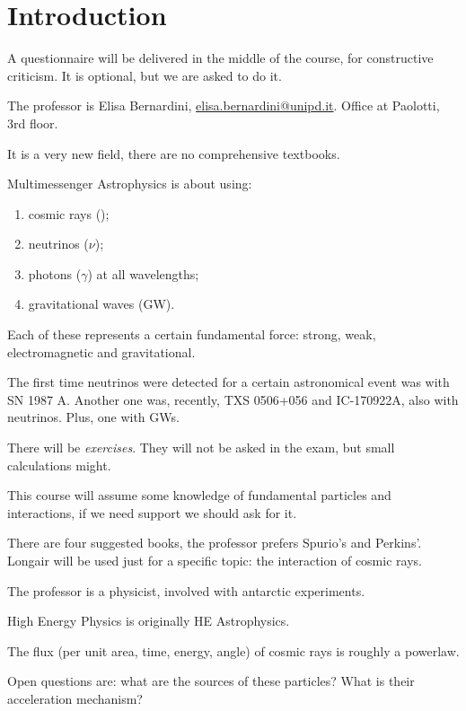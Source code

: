 \documentclass[main.tex]{subfiles}
\begin{document}

\section*{Introduction}


A questionnaire will be delivered in the middle of the course, for constructive criticism. It is optional, but we are asked to do it. 

The professor is Elisa Bernardini, \url{elisa.bernardini@unipd.it}. Office at Paolotti, 3rd floor. 

It is a very new field, there are no comprehensive textbooks. 

Multimessenger Astrophysics is about using: 
\begin{enumerate}
  \item cosmic rays ();
  \item neutrinos (\(\nu \));
  \item photons (\(\gamma \)) at all wavelengths;
  \item gravitational waves (GW).
\end{enumerate}

Each of these represents a certain fundamental force: strong, weak, electromagnetic and gravitational.

The first time neutrinos were detected for a certain astronomical event was with SN 1987 A. 
Another one was, recently, TXS 0506+056 and IC-170922A, also with neutrinos. 
Plus, one with GWs.

There will be \emph{exercises}. 
They will not be asked in the exam, but small calculations might.

This course will assume some knowledge of fundamental particles and interactions, if we need support we should ask for it.

There are four suggested books, the professor prefers Spurio's and Perkins'. 
Longair will be used just for a specific topic: the interaction of cosmic rays. 

The professor is a physicist, involved with antarctic experiments.

High Energy Physics is originally HE Astrophysics. 

The flux (per unit area, time, energy, angle) of cosmic rays is roughly a powerlaw. 

Open questions are: what are the sources of these particles? What is their acceleration mechanism?
\end{document}
